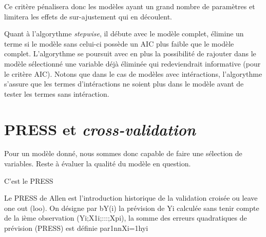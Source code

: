 Ce critère pénalisera donc les modèles ayant un grand nombre de paramètres et limitera les effets de sur-ajustement qui en découlent. 

Quant à l'algorythme \emph{stepwise}, il débute avec le modèle complet, élimine un terme si le modèle sans celui-ci possède un AIC plus faible que le modèle complet. L'algorythme se poursuit avec en plus la possibilité de rajouter dans le modèle sélectionné une variable déjà éliminée qui redeviendrait informative (pour le critère AIC).  
Notons que dans le cas de modèles avec intéractions, l'algorythme s'assure que les termes d'intéractions ne soient plus dans le modèle avant de tester les termes sans intéraction. 


\section{PRESS et \emph{cross-validation}}

Pour un modèle donné, nous sommes donc capable de faire une sélection de variables. Reste à évaluer la qualité du modèle en question. 

C'est le PRESS

Le  PRESS  de  Allen  est  l’introduction  historique  de  la  validation  croisée
ou leave one out (loo). On désigne par bY(i) la prévision de Yi calculée sans
tenir compte de la ième observation (Yi;X1i;:::;Xpi), la somme des erreurs
quadratiques de prévision (PRESS) est définie par1nnXi=1hyi





